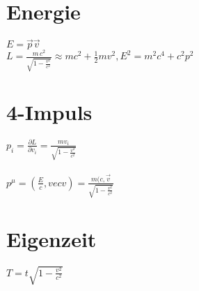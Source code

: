 \documentclass[10pt,a4paper]{article}
\begin{document}
\section{Energie}
$E=\vec{p}\vec{v}$\\
$L=\frac{m \, c^2}{\sqrt{1-\frac{v^2}{c^2}}}\approx mc^2+\frac{1}{2}mv^2, E^2= m^2c^4+c^2p^2$\\
%
\section{4-Impuls}
$p_i=\frac{\partial L}{\partial v_i}= \frac{mv_i}{\sqrt{1-\frac{v^2}{c^2}}}$\\
%
\\
$p^\mu = (\frac{E}{c},vec{v})= \frac{m(c,\vec{v}}{\sqrt{1-\frac{v^2}{c^2}}}$\\
%
\section{Eigenzeit}
$T=t\sqrt{1-\frac{v^2}{c^2}}$
\end{document}
